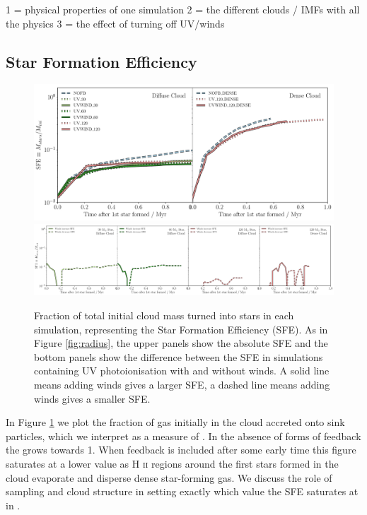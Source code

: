 \documentclass[a4paper,fleqn,usenatbib]{mnras}
\newcommand{\HII}{H \textsc{ii}\xspace}
\begin{document}
1 = physical properties of one simulation
2 = the different clouds / IMFs with all the physics
3 = the effect of turning off UV/winds

\subsection{Star Formation Efficiency}

\begin{figure}
	\includegraphics[width=2\columnwidth]{../plots/tsfe_both.pdf}
	\includegraphics[width=2\columnwidth]{../plots/tsfe_both_compare.pdf}
	\caption{Fraction of total initial cloud mass turned into stars in each simulation, representing the Star Formation Efficiency (SFE). As in Figure \ref{fig:radius}, the upper panels show the absolute SFE and the bottom panels show the difference between the SFE in simulations containing UV photoionisation with and without winds.  A solid line means adding winds gives a larger SFE, a dashed line means adding winds gives a smaller SFE.}
	\label{fig:tsfe}
\end{figure}

In Figure \ref{fig:tsfe} we plot the fraction of gas initially in the cloud accreted onto sink particles, which we interpret as a measure of \SFE. In the absence of forms of feedback the \SFE grows towards 1. When feedback is included after some early time this figure saturates at a lower value as \HII regions around the first stars formed in the cloud evaporate and disperse dense star-forming gas. We discuss the role of \IMF sampling and cloud structure in setting exactly which value the SFE saturates at in \cite{Geen2018}.
\end{document}
